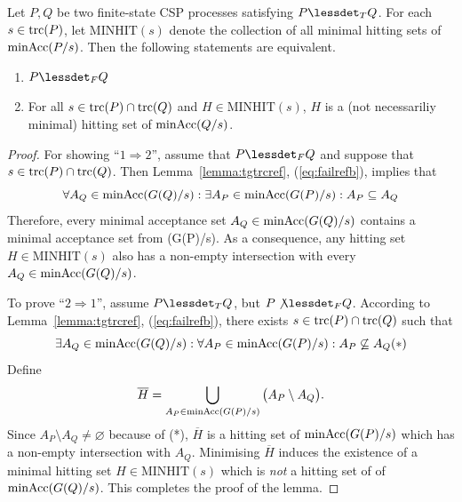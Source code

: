 \begin{lemma}
\label{lemma:hseta}
Let $P, Q$ be two finite-state CSP processes satisfying $P\lessdet_T Q$. 
For each $s\in\text{trc}(P)$,
let $\text{MINHIT}(s)$ denote the
collection of all minimal hitting sets of $\text{minAcc}(P/s)$. 
Then the following statements are equivalent.
\begin{enumerate}
\item $P\lessdet_F Q$
\item For all $s\in\text{trc}(P)\cap \text{trc}(Q)$ and $H \in  \text{MINHIT}(s)$, $H$ is
a (not necessariliy minimal) hitting set of $\text{minAcc}(Q/s)$.
\end{enumerate}
\end{lemma}
\begin{proof}
For showing ``$1 \Rightarrow 2$'', assume that $P\lessdet_F Q$ and suppose that
$s\in\text{trc}(P)\cap \text{trc}(Q)$. Then Lemma~\ref{lemma:tgtrcref}, (\ref{eq:failrefb}), implies that 
\[
\forall A_Q\in\text{minAcc}(G(Q)/s):
\exists A_P\in\text{minAcc}(G(P)/s): A_P\subseteq A_Q
\]
Therefore, every minimal acceptance set $A_Q\in\text{minAcc}(G(Q)/s)$ contains a
minimal acceptance set from  \minaccs(G(P)/s). As a consequence, any hitting set
$H \in  \text{MINHIT}(s)$ also has a non-empty intersection with every 
$A_Q\in\text{minAcc}(G(Q)/s)$.

To prove ``$2 \Rightarrow 1$'',
assume $P\lessdet_T Q$, but $P\not\lessdet_F Q$. According to Lemma~\ref{lemma:tgtrcref}, (\ref{eq:failrefb}), there exists $s\in\text{trc}(P)\cap \text{trc}(Q)$ such that 
\[
\exists A_Q\in\text{minAcc}(G(Q)/s): \forall A_P\in\text{minAcc}(G(P)/s): A_P\not\subseteq A_Q (*)
\]
Define 
\[
\overline H = \bigcup_{A_P\in\text{minAcc}(G(P)/s)} \big( A_P \setminus A_Q \big).
\]
Since $A_P \setminus A_Q \neq\varnothing$ because of (*), $\overline H$ is a hitting set
of $\text{minAcc}(G(P)/s)$ which has a non-empty intersection with $A_Q$. Minimising 
$\overline H$ induces the existence
of a minimal hitting set $H\in \text{MINHIT}(s)$ which is {\it not} a hitting set of 
of $\text{minAcc}(G(Q)/s)$. This completes the proof of the lemma.
\xbox
\end{proof}

%
%







 